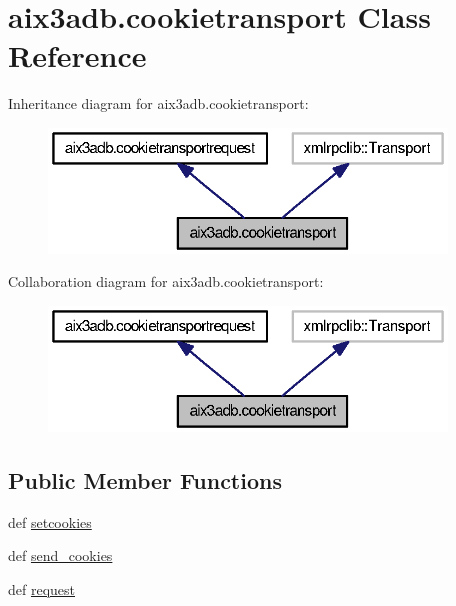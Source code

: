 \section{aix3adb.\-cookietransport Class Reference}
\label{classaix3adb_1_1cookietransport}


Inheritance diagram for aix3adb.\-cookietransport\-:
\nopagebreak
\begin{figure}[H]
\begin{center}
\leavevmode
\includegraphics[width=300pt]{classaix3adb_1_1cookietransport__inherit__graph}
\end{center}
\end{figure}


Collaboration diagram for aix3adb.\-cookietransport\-:
\nopagebreak
\begin{figure}[H]
\begin{center}
\leavevmode
\includegraphics[width=300pt]{classaix3adb_1_1cookietransport__coll__graph}
\end{center}
\end{figure}
\subsection*{Public Member Functions}
\begin{DoxyCompactItemize}
\item 
def \hyperlink{classaix3adb_1_1cookietransportrequest_abe6fadeb9e155d3c411054a107b09a80}{setcookies}
\item 
def \hyperlink{classaix3adb_1_1cookietransportrequest_aea3312026b80bf1f9245bac8c99e13d7}{send\-\_\-cookies}
\item 
def \hyperlink{classaix3adb_1_1cookietransportrequest_ad6b074fd05e772950428b808e9fd789e}{request}
\end{DoxyCompactItemize}
